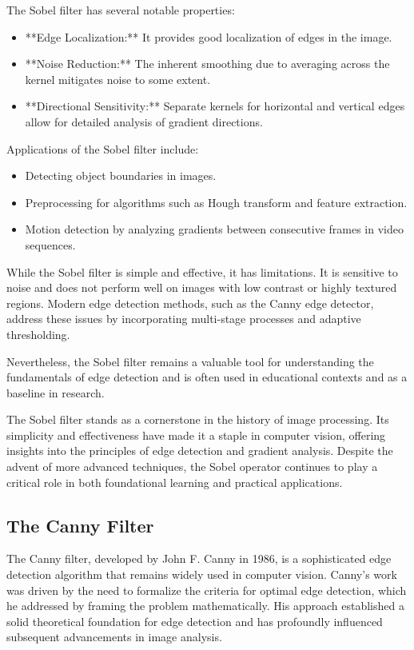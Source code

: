 \documentclass[11pt]{book}
\begin{document}
The Sobel filter has several notable properties:
\begin{itemize}
    \item **Edge Localization:** It provides good localization of edges in the image.
    \item **Noise Reduction:** The inherent smoothing due to averaging across the kernel mitigates noise to some extent.
    \item **Directional Sensitivity:** Separate kernels for horizontal and vertical edges allow for detailed analysis of gradient directions.
\end{itemize}

Applications of the Sobel filter include:
\begin{itemize}
    \item Detecting object boundaries in images.
    \item Preprocessing for algorithms such as Hough transform and feature extraction.
    \item Motion detection by analyzing gradients between consecutive frames in video sequences.
\end{itemize}

While the Sobel filter is simple and effective, it has limitations. It is sensitive to noise and does not perform well on images with low contrast or highly textured regions. Modern edge detection methods, such as the Canny edge detector, address these issues by incorporating multi-stage processes and adaptive thresholding.

Nevertheless, the Sobel filter remains a valuable tool for understanding the fundamentals of edge detection and is often used in educational contexts and as a baseline in research.

The Sobel filter stands as a cornerstone in the history of image processing. Its simplicity and effectiveness have made it a staple in computer vision, offering insights into the principles of edge detection and gradient analysis. Despite the advent of more advanced techniques, the Sobel operator continues to play a critical role in both foundational learning and practical applications.


\subsection{The Canny Filter}

The Canny filter, developed by John F. Canny in 1986, is a sophisticated edge detection algorithm that remains widely used in computer vision. Canny's work was driven by the need to formalize the criteria for optimal edge detection, which he addressed by framing the problem mathematically. His approach established a solid theoretical foundation for edge detection and has profoundly influenced subsequent advancements in image analysis.
\end{document}
